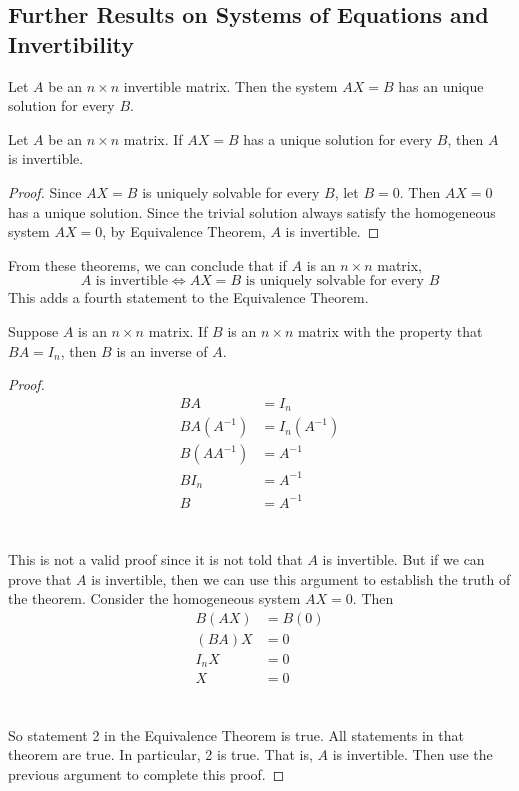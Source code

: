 \documentclass[12pt]{article}
\begin{document}
  \subsection{Further Results on Systems of Equations and Invertibility} 
  \begin{theorem} Let $A$ be an $ n \times n$ invertible matrix. Then the system $AX = B$ has an unique solution for every $B$. \end{theorem} 
  \begin{theorem} Let $A$ be an $n \times n$ matrix. If $AX = B$ has a unique solution for every $B$, then $A$ is invertible. \end{theorem} 
  \begin{proof} Since $AX = B$ is uniquely solvable for every $B$, let $B = 0$. Then $AX = 0$ has a unique solution. Since the trivial solution always satisfy the homogeneous system $AX = 0$, by Equivalence Theorem, $A$ is invertible. \end{proof}
  From these theorems, we can conclude that if $A$ is an $n \times n$ matrix, $$ A\text{ is invertible} \iff AX = B \text{ is uniquely solvable for every } B $$ This adds a fourth statement to the Equivalence Theorem. 
  \begin{theorem} Suppose $A$ is an $n \times n$ matrix. If $B$ is an $n \times n$ matrix with the property that $BA = I_n$, then $B$ is an inverse of $A$. \end{theorem}
  \begin{proof} \begin{align*} BA &= I_n \\ BA(A^{-1}) &= I_n(A^{-1}) \\ B(AA^{-1}) &= A^{-1} \\ BI_n &= A^{-1} \\ B &= A^{-1} \end{align*} \\~\\ This is not a valid proof since it is not told that $A$ is invertible. But if we can prove that $A$ is invertible, then we can use this argument to establish the truth of the theorem. Consider the homogeneous system $AX = 0$. Then \begin{align*} B(AX) &= B(0) \\ (BA)X &= 0 \\ I_nX &= 0 \\ X &= 0 \end{align*} \\~\\ So statement 2 in the Equivalence Theorem is true. All statements in that theorem are true. In particular, 2 is true. That is, $A$ is invertible. Then use the previous argument to complete this proof. \end{proof} 
\end{document}
